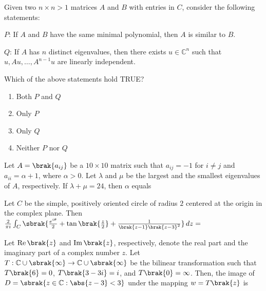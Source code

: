 
\iffalse
    \title{Assignment}
    \author{EE24BTECH11034}
    \section{ma}
    \chapter{2017}
  \fi
\item Given two $n \times n > 1$ matrices $A$ and $B$ with entries in $C$, consider the following statements:

$P$: If $A$ and $B$ have the same minimal polynomial, then $A$ is similar to $B$.

$Q$: If $A$ has $n$ distinct eigenvalues, then there exists $u \in \mathbb{C}^n$ such that  
 $u, A u, \ldots, A^{n-1} u$ are linearly independent.

Which of the above statements hold TRUE?

\begin{enumerate}
    \item Both $P$ and $Q$
    \item Only $P$
    \item Only $Q$
    \item Neither $P$ nor $Q$
\end{enumerate}

\item Let $A = \brak{a_{ij}}$ be a $10 \times 10$ matrix such that $a_{ij} = -1$ for $i \neq j$ and $a_{ii} = \alpha + 1$, where $\alpha > 0$. Let $\lambda$ and $\mu$ be the largest and  
 the smallest eigenvalues of $A$, respectively. If $\lambda + \mu = 24$, then $\alpha$ equals  

\item Let $C$ be the simple, positively oriented circle of radius $2$ centered at the origin in the complex plane. Then
$\frac{2}{\pi i}\int_{C} \sbrak{\frac{e^{i \theta}}{2} + \tan \brak{\frac{z}{2}} + \frac{1}{\brak{z - 1} \brak{z - 3}^2}} \, dz = $

\item Let $\operatorname{Re} \brak{z}$ and $\operatorname{Im} \brak{z}$, respectively, denote the real part and the imaginary part of a complex number $z$. Let $T: \mathbb{C} \cup \sbrak{\infty}  
 \to \mathbb{C} \cup \sbrak{\infty}$ be the bilinear transformation such that $T \brak{6} = 0$, $T \brak{3 - 3 i} = i$, and $T \brak{0} = \infty$. Then, the image of $D = \sbrak{z \in \mathbb{C} : \abs{z - 3} < 3}$ under the mapping $w = T \brak{z}$ is

